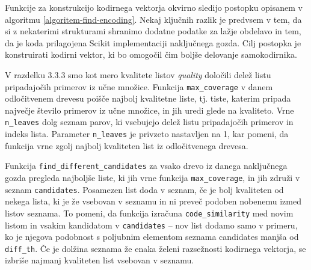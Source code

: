 \documentclass[12pt,a4paper,twoside]{article}
\theoremstyle{definition} %
\theoremstyle{plain} %
\numberwithin{equation}{section}  %
\begin{document}


Funkcije za konstrukcijo kodirnega vektorja okvirno sledijo postopku opisanem v algoritmu \ref{algoritem-find-encoding}.
Nekaj ključnih razlik je predvsem v tem, da si z nekaterimi strukturami shranimo dodatne podatke za lažje obdelavo in tem, da je koda prilagojena Scikit implementaciji naključnega gozda.
Cilj postopka je konstruirati kodirni vektor, ki bo omogočil čim boljše delovanje samokodirnika.

V razdelku 3.3.3 smo kot mero kvalitete listov \textit{quality} določili delež listu pripadajočih primerov iz učne množice. 
Funkcija \texttt{max\_\-coverage} v danem odločitvenem drevesu poišče najbolj kvalitetne liste, tj. tiste, katerim pripada največje število primerov iz učne množice, in jih uredi glede na kvaliteto.
Vrne \texttt{n\_\-leaves} dolg seznam parov, ki vsebujejo delež listu pripadajočih primerov in indeks lista. 
Parameter \texttt{n\_\-leaves} je privzeto nastavljen na 1, kar pomeni, da funkcija vrne zgolj najbolj kvaliteten list iz odločitvenega drevesa.

Funkcija \texttt{find\_\-different\_\-candidates} za vsako drevo iz danega naključnega gozda pregleda najboljše liste, ki jih vrne funkcija \texttt{max\_\-coverage}, in jih združi v seznam \texttt{candidates}.
Posamezen list doda v seznam, če je bolj kvaliteten od nekega lista, ki je že vsebovan v seznamu in ni preveč podoben nobenemu izmed listov seznama.
To pomeni, da funkcija izračuna \texttt{code\_similarity} med novim listom in vsakim kandidatom v \texttt{candidates} -- nov list dodamo samo v primeru, ko je njegova podobnost s poljubnim elementom seznama candidates manjša od \texttt{diff\_th}.
Če je dolžina seznama že enaka želeni razsežnosti kodirnega vektorja, se izbriše najmanj kvaliteten list vsebovan v seznamu.
\end{document}
